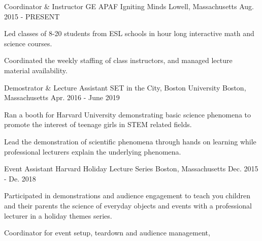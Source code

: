 

\begin{cventries}

  \cventry
    {Coordinator \& Instructor} %
    {GE APAF Igniting Minds} %
    {Lowell, Massachusetts} %
    {Aug. 2015 - PRESENT} %
    {
      \begin{cvitems} %
        \item {Led classes of 8-20 students from ESL schools in hour long interactive math and science courses.}
        \item {Coordinated the weekly staffing of class instructors, and managed lecture material availability.}
      \end{cvitems}
    }

  \cventry
    {Demostrator \& Lecture Assistant} %
    {SET in the City, Boston University} %
    {Boston, Massachusetts} %
    {Apr. 2016 - June 2019} %
    {
      \begin{cvitems} %
        \item {Ran a booth for Harvard University demonstrating basic science phenomena to promote the interest of teenage girls in STEM related fields.}
        \item {Lead the demonstration of scientific phenomena through hands on learning while professional lecturers explain the underlying phenomena.}
      \end{cvitems}
    }

  \cventry
    {Event Assistant} %
    {Harvard Holiday Lecture Series} %
    {Boston, Massachusetts} %
    {Dec. 2015 - De. 2018} %
    {
      \begin{cvitems} %
      \item {Participated in demonstrations and audience engagement to teach you children and their parents the science of everyday objects and events with a professional lecturer in a holiday themes series.}
      \item {Coordinator for event setup, teardown and audience management,}
      \end{cvitems}
    }
\end{cventries}
